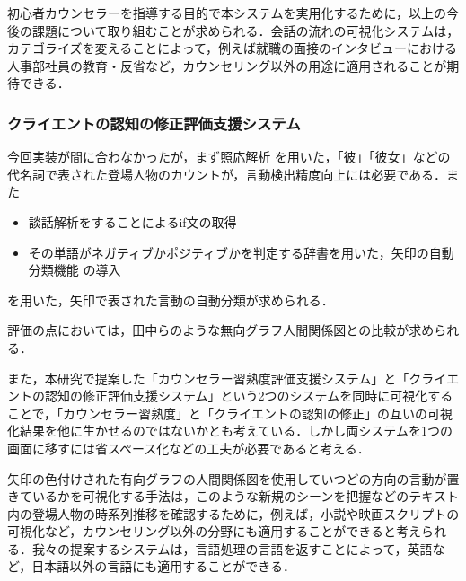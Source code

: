 \documentclass[shuuron]{kuee}
\begin{document}
初心者カウンセラーを指導する目的で本システムを実用化するために，以上の今後の課題について取り組むことが求められる．会話の流れの可視化システムは，カテゴライズを変えることによって，例えば就職の面接のインタビューにおける人事部社員の教育・反省など，カウンセリング以外の用途に適用されることが期待できる．%

\subsubsection{クライエントの認知の修正評価支援システム}

今回実装が間に合わなかったが，まず照応解析\cite{sasano2009probabilistic} \cite{sasano2011discriminative}を用いた，「彼」「彼女」などの代名詞で表された登場人物のカウントが，言動検出精度向上には必要である．また
\begin{itemize}
  \item 談話解析をすることによるif文の取得\cite{kishimoto}
  \item その単語がネガティブかポジティブかを判定する辞書を用いた，矢印の自動分類機能\cite{小林のぞみ2005意見抽出のための評価表現の収集} \cite{東山昌彦2008述語の選択選好性に着目した名詞評価極性の獲得} の導入
\end{itemize}
を用いた，矢印で表された言動の自動分類が求められる．

評価の点においては，田中ら\cite{tanaka}のような無向グラフ人間関係図との比較が求められる．

また，本研究で提案した「カウンセラー習熟度評価支援システム」と「クライエントの認知の修正評価支援システム」という2つのシステムを同時に可視化することで，「カウンセラー習熟度」と「クライエントの認知の修正」の互いの可視化結果を他に生かせるのではないかとも考えている．しかし両システムを1つの画面に移すには省スペース化などの工夫が必要であると考える．

矢印の色付けされた有向グラフの人間関係図を使用していつどの方向の言動が置きているかを可視化する手法は，このような新規のシーンを把握などのテキスト内の登場人物の時系列推移を確認するために，例えば，小説や映画スクリプトの可視化など，カウンセリング以外の分野にも適用することができると考えられる．我々の提案するシステムは，言語処理の言語を返すことによって，英語など，日本語以外の言語にも適用することができる．
\end{document}
